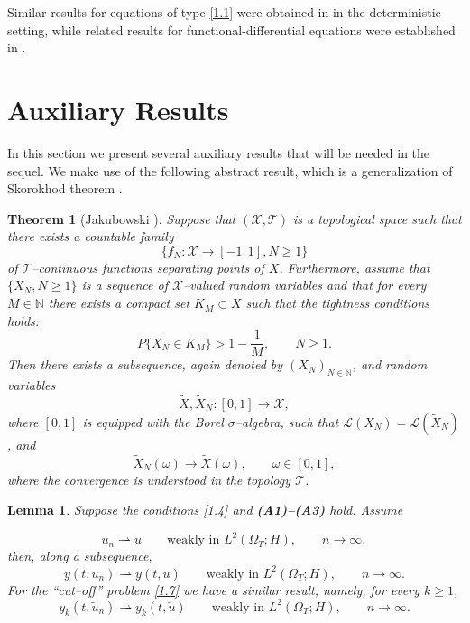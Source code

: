 \documentclass[a4paper,12pt]{article}
\newtheorem{theorem}[definition]{Theorem}
\newtheorem{lemma}[definition]{Lemma}
\numberwithin{equation}{section}
\begin{document}
Similar results for equations of type \eqref{1.1}
were obtained in \cite{21,22} in the deterministic setting,
while related results for functional-differential equations were
established in \cite{23}.

\section{Auxiliary Results} \label{Sec:3}

In this section we present several auxiliary results that will be
needed in the sequel. We make use of the following abstract result, which is a
generalization of Skorokhod theorem \cite{24}.

\begin{theorem}[Jakubowski {\cite{25}}] \label{Th:3.1}
Suppose that $(\mathcal{X},\mathcal T)$ is a topological space such that there
exists a countable family
$$\{f_N:\mathcal{X}\to[-1,1], N \geq 1\}$$ of $\mathcal T$--continuous functions separating points of $X$. Furthermore, assume that $\{X_N, N \geq 1\}$ is a sequence of
$\mathcal{X}$--valued random variables and that for every $M\in\mathbb N$
there exists a compact set $K_M\subset X$ such that the tightness conditions holds:
\[
P\{X_N\in K_M\}
>
1-\frac1M,
\qquad
N \geq 1.
\]
Then there exists a subsequence, again denoted by
$(X_N)_{N\in\mathbb N}$, and random variables
\[
\widetilde X,
\widetilde X_N:[0,1]\to \mathcal{X},
\]
where $[0,1]$ is equipped with the Borel $\sigma$--algebra, such
that $\mathcal L(X_N)
=
\mathcal L(\widetilde X_N)$,
and
\[
\widetilde X_N(\omega)\to \widetilde X(\omega),
\qquad
\omega\in[0,1],
\]
where the convergence is understood in the topology
$\mathcal T$.
\end{theorem}

\begin{lemma}\label{lem:3.2}
Suppose the conditions \eqref{1.4} and {{\bf\rm(A1)--(A3)}} hold.
Assume 

\[
 u_n \rightharpoonup u
\qquad\text{weakly in }L^2(\Omega_T;H),
\qquad
n\to\infty,
\]
then, along a subsequence,
\begin{equation} y(t, u_n)
\rightharpoonup
 y(t, u)
\qquad\text{weakly in }
L^2(\Omega_T;H),
\qquad
n\to\infty.
\label{3.1}
\end{equation}
For the ``cut--off'' problem \eqref{1.7} we have a similar result, namely, for every $k \ge 1$,
\begin{equation}
y_k(t, \widetilde u_n)
\rightharpoonup
y_k(t, \widetilde u)
\qquad\text{weakly in }
L^2(\Omega_T;H),
\qquad
n\to\infty.
\label{3.2}
\end{equation}
\end{lemma}
\end{document}
